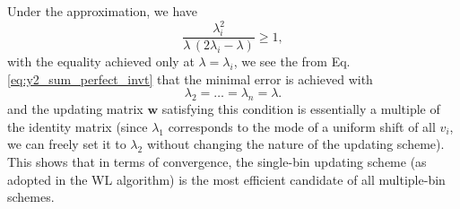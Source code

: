 \documentclass[reprint]{revtex4-1}
\begin{document}
Under the approximation, we have
$$
\frac{ \lambda_i^2 }{ \lambda \, (2 \lambda_i - \lambda) } \ge 1,
$$
with the equality achieved only at $\lambda = \lambda_i$,
we see the from Eq. \eqref{eq:y2_sum_perfect_invt}
that the minimal error is achieved with
\begin{equation}
  \lambda_2 = \dots = \lambda_n = \lambda.
\end{equation}
%
and the updating matrix $\mathbf w$ satisfying this condition
is essentially a multiple of the identity matrix
(since $\lambda_1$ corresponds to the mode
of a uniform shift of all $v_i$,
we can freely set it to $\lambda_2$
without changing the nature of the updating scheme).
%
This shows that in terms of convergence,
the single-bin updating scheme
(as adopted in the WL algorithm)
is the most efficient candidate
of all multiple-bin schemes.





\end{document}
